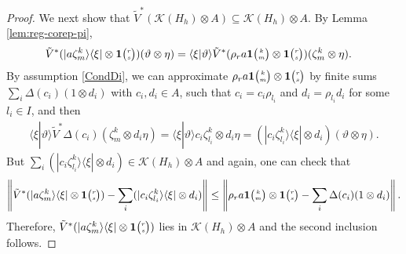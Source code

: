 \documentclass[11pt]{article}
\newcommand{\Grt}[3]{#1{\tiny {\begin{pmatrix} #2\\#3\end{pmatrix}}}}
\newcommand{\UnitC}[2]{\Grt{\mathbf{1}}{#1}{#2}}
\theoremstyle{definition}
\numberwithin{equation}{section}
\begin{document}
\begin{proof}
   We next show that $\tilde V^{*}(\mathcal{K}(H_{h}) \otimes A)
   \subseteq \mathcal{K}(H_{h}) \otimes A$.  By Lemma
   \ref{lem:reg-corep-pi},
   \begin{align*}
     \tilde V^{*}(|a\zeta^{k}_{m}\rangle\langle\xi| \otimes
     \UnitC{r}{s})(\vartheta\otimes \eta) &=  \langle
     \xi|\vartheta\rangle \tilde V^{*}(\rho_{r}a\UnitC{k}{m}\otimes
     \UnitC{r}{s})(\zeta^{k}_{m} \otimes \eta).
   \end{align*}
   By assumption \eqref{CondDi}, we can approximate $\rho_{r}a
   \UnitC{k}{m}\otimes
   \UnitC{r}{s}$ by finite sums $\sum_{i} \Delta(c_{i})(1 \otimes d_{i})$ with
   $c_{i}, d_{i} \in A$, such that $c_{i} =c_{i}\rho_{l_{i}}$ and
   $d_{i}=\rho_{l_{i}}d_{i}$ for some $l_{i} \in I$, and then
   \begin{align*}
     \langle \xi|\vartheta\rangle \tilde
     V^{*}\Delta(c_{i})(\zeta^{k}_{m}\otimes d_{i}\eta) = \langle
     \xi|\vartheta\rangle c_{i}\zeta^{k}_{l_{i}} \otimes d_{i}\eta =
     (|c_{i}\zeta^{k}_{l_{i}}\rangle\langle\xi| \otimes
     d_{i})(\vartheta\otimes \eta).
   \end{align*}
But $\sum_{i}     (|c_{i}\zeta^{k}_{l_{i}}\rangle\langle\xi| \otimes
     d_{i}) \in \mathcal{K}(H_{h}) \otimes A$ and again, one can check
     that
     \begin{align*}
       \left\|      \tilde V^{*}(|a\zeta^{k}_{m}\rangle\langle\xi| \otimes
     \UnitC{r}{s}) - \sum_{i}     (|c_{i}\zeta^{k}_{l_{i}}\rangle\langle\xi| \otimes
     d_{i})  \right\| \leq \left\|
\rho_{r}a
   \UnitC{k}{m}\otimes
   \UnitC{r}{s} - \sum_{i} \Delta(c_{i})(1 \otimes d_{i})
   \right\|.
     \end{align*}
     Therefore, $   \tilde V^{*}(|a\zeta^{k}_{m}\rangle\langle\xi| \otimes
     \UnitC{r}{s})$ lies in $\mathcal{K}(H_{h}) \otimes A$ and the
     second inclusion follows.
\end{proof}
\end{document}
